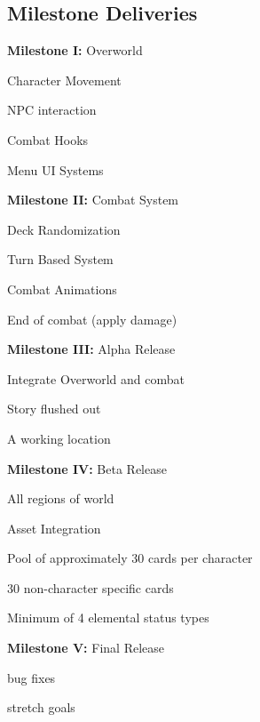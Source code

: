\documentclass[12pt,titlepage]{article}
\begin{document}
\subsection{Milestone Deliveries}
\begin{todolist}
    \item \textbf{Milestone I:} Overworld
        \begin{todolist}
            \item Character Movement
            \item NPC interaction
            \item Combat Hooks
            \item Menu UI Systems
        \end{todolist}

    \item \textbf{Milestone II:} Combat System
        \begin{todolist}
            \item Deck Randomization
            \item Turn Based System
            \item Combat Animations
            \item End of combat (apply damage)
        \end{todolist}

    \item \textbf{Milestone III:} Alpha Release
        \begin{todolist}
            \item Integrate Overworld and combat
            \item Story flushed out
            \item A working location
        \end{todolist}

    \item \textbf{Milestone IV:} Beta Release
        \begin{todolist}
            \item All regions of world
            \item Asset Integration
            \item Pool of approximately 30 cards per character
            \item 30 non-character specific cards
            \item Minimum of 4 elemental status types
        \end{todolist}

    \item \textbf{Milestone V:} Final Release
        \begin{todolist}
            \item bug fixes
            \item stretch goals
        \end{todolist}
\end{todolist}
\end{document}
